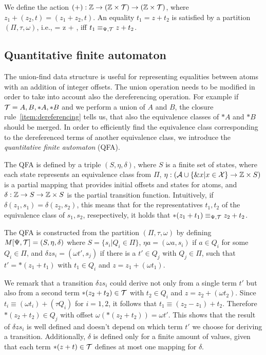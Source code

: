 We define the action $(+): \mathbb{Z} \rightarrow (\mathbb{Z} \times \mathcal{T}) \rightarrow (\mathbb{Z} \times \mathcal{T})$, where $z_1 + (z_2,t) = (z_1 + z_2, t)$.
An equality $t_1 = z + t_2$ is satisfied by a partition $(\Pi, \tau, \omega)$, i.e.,  = z + , iff $t_1 \equiv_{\Psi,\mathcal{T}} z + t_2$.

\subsection{Quantitative finite automaton}

The union-find data structure is useful for representing equalities between atoms
with an addition of integer offsets.
The union operation needs to be modified in order to take into account also the dereferencing operation.
For example if $\mathcal{T} = {A, B, *A, *B}$ and we perform a union of $A$ and $B$, the
closure rule~\ref{item:dereferencing} tells us, that also the equivalence classes of $*A$ and $*B$ should be merged.
In order to efficiently find the equivalence class corresponding to the dereferenced terms of another equivalence class, we introduce the \emph{quantitative finite automaton} (QFA).

The QFA is defined by a triple $(S, \eta, \delta)$, where $S$ is a finite set of states, where each state represents an equivalence class from $\Pi$, $\eta : (\mathcal{A} \cup \{\&x | x \in \mathcal{X}\} \rightarrow \mathbb{Z} \times S)$ is a partial mapping that provides initial offsets and states for atoms, and $\delta : \mathbb{Z} \rightarrow S \rightarrow \mathbb{Z} \times S$ is the partial transition function.
Intuitively, if $\delta(z_1, s_1) = \delta(z_2, s_2)$, this means that for the representatives
$t_1, t_2$ of the equivalence class of $s_1,s_2$, resepectively, it holds that $*(z_1 + t_1) \equiv_{\Psi,\mathcal{T}} z_2 + t_2$.

The QFA is constructed from the partition  $(\Pi, \tau, \omega)$ by defining $M[\Psi,\mathcal{T}] = (S, \eta, \delta)$ where $S = \{s_i | Q_i \in \Pi\}$, $\eta a = (\omega a, s_i)$ if $a \in Q_i$ for some $Q_i \in \Pi$, and $\delta z s_i = (\omega t', s_j)$ if there is a $t' \in Q_j$ with $Q_j \in \Pi$, such that $t' = *(z_1 + t_1)$ with $t_1 \in Q_i$ and $z = z_1 + (\omega t_1)$.

We remark that a transition $\delta z s_i$ could derive not only from a single term $t'$ but also from a second term $*(z_2 + t_2) \in \mathcal{T}$ with $t_2 \in Q_i$ and $z = z_2 + (\omega t_2)$.
Since $t_i \equiv (\omega t_i) + (\tau Q_i)$ for $i = 1,2$, it follows that $t_1 \equiv (z_2 - z_1)+ t_2$. Therefore $*(z_2+t_2)\in Q_j$ with offset $\omega(*(z_2+t_2)) = \omega t'$.
This shows that the result of $\delta z s_i$ is well defined and doesn't depend on which term $t'$ we choose for deriving a transition.
Additionally, $\delta$ is defined only for a finite amount of values, given that each term $*(z + t) \in \mathcal{T}$ defines at most one mapping for $\delta$.

